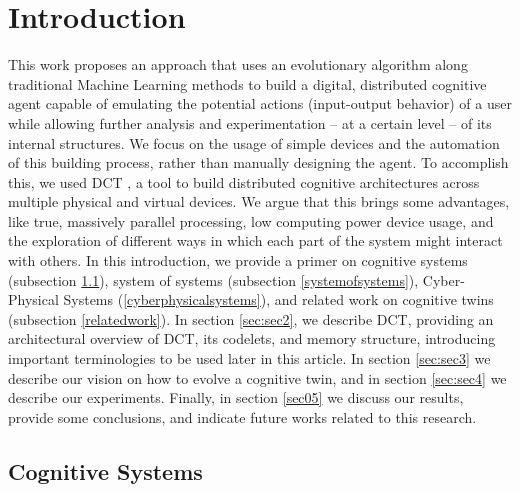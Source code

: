 \section{Introduction}
\label{sec:sec1}

This work proposes an approach that uses an evolutionary algorithm along traditional Machine Learning methods to build a digital, distributed cognitive agent capable of emulating the potential actions (input-output behavior) of a user while allowing further analysis and experimentation – at a certain level – of its internal structures. We focus on the usage of simple devices and the automation of this building process, rather than manually designing the agent. To accomplish this, we used DCT \citep{gibaut2020extending}, a tool to build distributed cognitive architectures across multiple physical and virtual devices. We argue that this brings some advantages, like true, massively parallel processing, low computing power device usage, and the exploration of different ways in which each part of the system might interact with others. In this introduction, we provide a primer on cognitive systems (subsection \ref{cognitivesystems}), system of systems (subsection \ref{systemofsystems}), Cyber-Physical Systems (\ref{cyberphysicalsystems}), and related work on cognitive twins (subsection \ref{relatedwork}). In section \ref{sec:sec2}, we describe DCT, providing an architectural overview of DCT, its codelets, and memory structure, introducing important terminologies to be used later in this article. In section \ref{sec:sec3} we describe our vision on how to evolve a cognitive twin, and in section \ref{sec:sec4} we describe our experiments. Finally, in section \ref{sec05} we discuss our results, provide some conclusions, and indicate future works related to this research. 




\subsection{Cognitive Systems}
\label{cognitivesystems}

